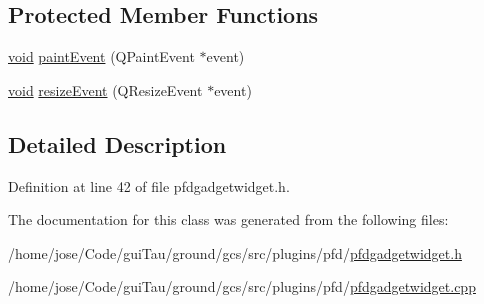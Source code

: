\subsection*{Protected Member Functions}
\begin{DoxyCompactItemize}
\item 
\hyperlink{group___u_a_v_objects_plugin_ga444cf2ff3f0ecbe028adce838d373f5c}{void} \hyperlink{group___o_p_map_plugin_gaf2685b40cf25a74f35cc9829ca64c774}{paint\-Event} (Q\-Paint\-Event $\ast$event)
\item 
\hyperlink{group___u_a_v_objects_plugin_ga444cf2ff3f0ecbe028adce838d373f5c}{void} \hyperlink{group___o_p_map_plugin_gabdb991171226a4eea59b92bc2daf7bc9}{resize\-Event} (Q\-Resize\-Event $\ast$event)
\end{DoxyCompactItemize}


\subsection{Detailed Description}


Definition at line 42 of file pfdgadgetwidget.\-h.



The documentation for this class was generated from the following files\-:\begin{DoxyCompactItemize}
\item 
/home/jose/\-Code/gui\-Tau/ground/gcs/src/plugins/pfd/\hyperlink{pfdgadgetwidget_8h}{pfdgadgetwidget.\-h}\item 
/home/jose/\-Code/gui\-Tau/ground/gcs/src/plugins/pfd/\hyperlink{pfdgadgetwidget_8cpp}{pfdgadgetwidget.\-cpp}\end{DoxyCompactItemize}
